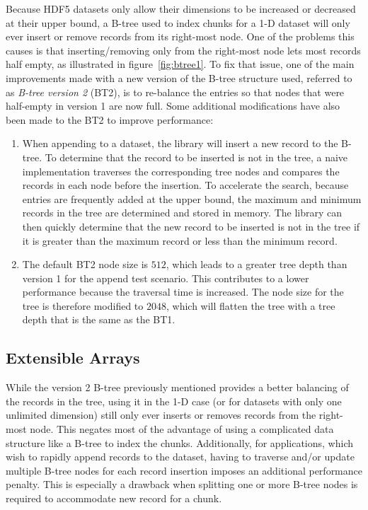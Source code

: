 Because HDF5 datasets only allow their dimensions to be increased or 
decreased at their upper bound, a B-tree used to index chunks for a 1-D 
dataset will only ever insert or remove records from its right-most node.
One of the problems this causes is that inserting/removing only from the right-most
node lets most records half empty, as illustrated in figure~\ref{fig:btree1}.
To fix that issue, one of the main improvements made with a new version of
the B-tree structure used, referred to as \textit{B-tree version 2} (BT2), is to
re-balance the entries so that nodes that were half-empty in version 1 are
now full.
Some additional modifications have also been made to the BT2 to improve performance:
\begin{enumerate}
\item
When appending to a dataset, the library will insert a new record to the
B-tree. To determine that the record to be inserted is not in the tree,
a naive implementation traverses the corresponding tree nodes and compares the records 
in each node before the insertion.
To accelerate the search, because entries are frequently added at the upper bound,
the maximum and minimum records in the tree are 
determined and stored in memory. The library can then quickly 
determine that the new record to be inserted is not in the tree if it is 
greater than the maximum record or less than the minimum record.
\item
The default BT2 node size is $512$, which leads to a greater tree depth
than version 1 for the append test scenario. This contributes to a lower
performance because the traversal time is increased. The node size for the
tree is therefore modified to $2048$, which will flatten the tree with a tree 
depth that is the same as the BT1.
\end{enumerate}

\subsection{Extensible Arrays}
While the version 2 B-tree previously mentioned provides a better
balancing of the records in the tree, using it in the 1-D case (or for
datasets with only one unlimited dimension) still only ever inserts or removes
records from the right-most node.
This negates most of the advantage of using a complicated data structure like a
B-tree to index the chunks.
Additionally, for applications, which wish to rapidly append records to the 
dataset, having to traverse and/or update multiple B-tree nodes for each 
record insertion imposes an additional performance penalty. This is 
especially a drawback when splitting one or more B-tree nodes is required to 
accommodate new record for a chunk.

